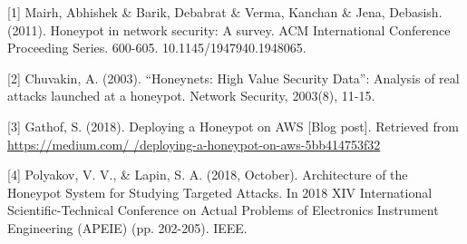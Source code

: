\documentclass{sig-alternate}
\begin{document}
%
%
%
[1] Mairh, Abhishek \& Barik, Debabrat \& Verma, Kanchan \& Jena, Debasish. (2011). Honeypot in network security: A survey. ACM International Conference Proceeding Series. 600-605. 10.1145/1947940.1948065. \linebreak

[2] Chuvakin, A. (2003). “Honeynets: High Value Security Data”: Analysis of real attacks launched at a honeypot. Network Security, 2003(8), 11-15. \linebreak

[3] Gathof, S. (2018). Deploying a Honeypot on AWS [Blog post]. Retrieved from \href{https://medium.com/@sudojune/deploying-a-honeypot-on-aws-5bb414753f32}{https://medium.com/
	\linebreak@sudojune/deploying-a-honeypot-on-aws-5bb414753f32}\linebreak

[4] Polyakov, V. V., \& Lapin, S. A. (2018, October). Architecture of the Honeypot System for Studying Targeted Attacks. In 2018 XIV International Scientific-Technical Conference on Actual Problems of Electronics Instrument Engineering (APEIE) (pp. 202-205). IEEE.
\end{document}
